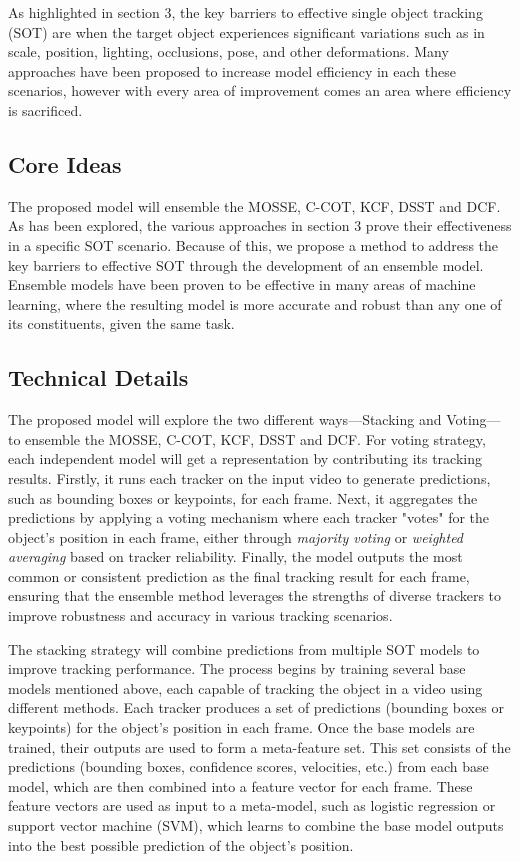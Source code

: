 \documentclass[11pt, letterpaper]{article}
\begin{document}
As highlighted in section 3, the key barriers to effective single object tracking (SOT) are when the target object experiences significant variations such as in scale, position, lighting, occlusions, pose, and other deformations. Many approaches have been proposed to increase model efficiency in each these scenarios, however with every area of improvement comes an area where efficiency is sacrificed.

\subsection{Core Ideas}

The proposed model will ensemble the MOSSE, C-COT, KCF, DSST and DCF. As has been explored, the various approaches in section 3 prove their effectiveness in a specific SOT scenario. Because of this, we propose a method to address the key barriers to effective SOT through the development of an ensemble model. Ensemble models have been proven to be effective in many areas of machine learning, where the resulting model is more accurate and robust than any one of its constituents, given the same task.

\subsection{Technical Details}

The proposed model will explore the two different ways—Stacking and Voting—to ensemble the MOSSE, C-COT, KCF, DSST and DCF.
For voting strategy, each independent model will get a representation by contributing its tracking results. Firstly, it runs each tracker on the input video to generate predictions, such as bounding boxes or keypoints, for each frame. Next, it aggregates the predictions by applying a voting mechanism where each tracker "votes" for the object's position in each frame, either through \emph{majority voting} or \emph{weighted averaging} based on tracker reliability. Finally, the model outputs the most common or consistent prediction as the final tracking result for each frame, ensuring that the ensemble method leverages the strengths of diverse trackers to improve robustness and accuracy in various tracking scenarios.

The stacking strategy will combine predictions from multiple SOT models to improve tracking performance. The process begins by training several base models mentioned above, each capable of tracking the object in a video using different methods. Each tracker produces a set of predictions (bounding boxes or keypoints) for the object's position in each frame.
Once the base models are trained, their outputs are used to form a meta-feature set. This set consists of the predictions (bounding boxes, confidence scores, velocities, etc.) from each base model, which are then combined into a feature vector for each frame. These feature vectors are used as input to a meta-model, such as logistic regression or support vector machine (SVM), which learns to combine the base model outputs into the best possible prediction of the object's position.
\end{document}
